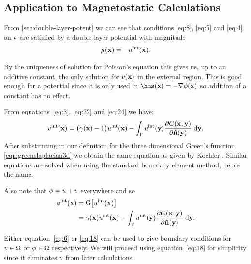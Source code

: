 \subsection{Application to Magnetostatic Calculations}
\label{sec:appl-magn-calc}

From \cref{sec:double-layer-potent} we can see that conditions \cref{eq:8}, \cref{eq:5} and \cref{eq:4} on $v$ are satisfied by a double layer potential with magnitude
\begin{equation}
  \label{eq:24}
  \mu(\mathbf{x}) = - u^{\text{int}}(\mathbf{x}).
\end{equation}

By the uniqueness of solution for Poisson's equation this gives us, up to an additive constant, the only solution for $v(\mathbf{x})$ in the external region.
This is good enough for a potential since it is only used in $\hms(\xv) = - \nabla \phim(\xv)$ so addition of a constant has no effect.

From equations~\cref{eq:3}, \cref{eq:22} and \cref{eq:24} we have:
\begin{equation}
  \label{eq:6}
  v^{\text{int}}(\mathbf{x}) =  \big(\gamma(\mathbf{x}) - 1 \big) u^{\text{int}}(\mathbf{x})
  - \int_{{\Gamma}} u^{\text{int}}(\mathbf{y}) \frac{\partial G(\mathbf{x}_{},\mathbf{y})}{\partial \mathbf{\hat{n}}(\mathbf{y})} {\; \text{d}} \mathbf{y}.
\end{equation}
After substituting in our definition for the three dimensional Green's function \cref{eqn:greenslaplacian3d} we obtain the same equation as given by Koehler \cite{Koehler1997}.
Similar equations are solved when using the standard boundary element method, hence the name.

Also note that $\phi = u + v$ everywhere and so
\begin{equation}
  \begin{aligned}
    \label{eq:18}
    \phi^{\text{int}}(\mathbf{x}) &= {\mathbf{\mathrm{G}}} \big[ u^{\text{int}}(\mathbf{x}) \big] \\
    &= \gamma(\mathbf{x}) u^{\text{int}}(\mathbf{x})
    - \int_{{\Gamma}} u^{\text{int}}(\mathbf{y}) \frac{\partial G(\mathbf{x}_{},\mathbf{y})}{\partial \mathbf{\hat{n}}(\mathbf{y})} {\; \text{d}} \mathbf{y}.
  \end{aligned}
\end{equation}

Either equation~\cref{eq:6} or \cref{eq:18} can be used to give boundary conditions for $v \in \Omega$ or $\phi \in \Omega$ respectively.
We will proceed using equation~\cref{eq:18} for simplicity since it eliminates $v$ from later calculations.

